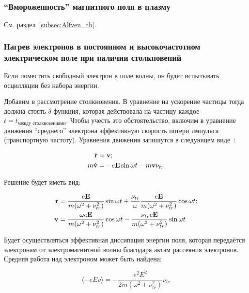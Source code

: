 \documentclass[10pt, a4paper]{article}
\begin{document}
\subsubsection{ ``Вмороженность'' магнитного поля в плазму}

См. раздел~\ref{subsec:Alfven_th}.

\subsubsection{Нагрев электронов в постоянном и высокочастотном электрическом поле при наличии столкновений}

Если поместить свободный электрон в поле волны, он будет испытывать осцилляции без набора энергии.

Добавим в рассмотрение столкновения. В уравнение на ускорение частицы тогда должна стоять $\delta$-функция, которая действовала на частицу каждое $t=t_\text{между столкновениями}$. Чтобы учесть это обстоятельство, включим в уравнение движения ``среднего'' электрона
эффективную скорость потери импульса (транспортную частоту). Уравнения движения запишутся в следующем виде~\cite{raizer}:

\begin{align*}
	\dot{\vb{r}} &= \vb{v};\\ 
	m\dot{\vb{v}} &= -e\vb{E}\sin\omega t - m\vb{v}\nu_{tr} \\
\end{align*}

Решение будет иметь вид:

\begin{align*}
	\vb{r} &= \frac{e\vb{E}}{m(\omega^2+\nu_{tr}^2)} \sin\omega t +\frac{\nu_{tr}}{\omega}\frac{e\vb{E}}{m(\omega^2+\nu_{tr}^2)} \cos\omega t; \\
	\vb{v} &= \frac{\omega e\vb{E}}{m(\omega^2+\nu_{tr}^2)}\cos \omega t -\frac{\nu_{tr} e\vb{E}}{m(\omega^2+\nu_{tr}^2)}\sin \omega t
\end{align*}

Будет осуществляться эффективная диссипация энергии поля, которая передаётся электронам от электромагнитной волны благодаря актам рассеяния электронов. Средняя работа над электроном может быть найдена:

\begin{equation*}
	\langle -eEv \rangle =-\frac{e^2E^2}{2m (\omega^2+\nu_{tr}^2)} \nu_{tr}
\end{equation*}
\end{document}

